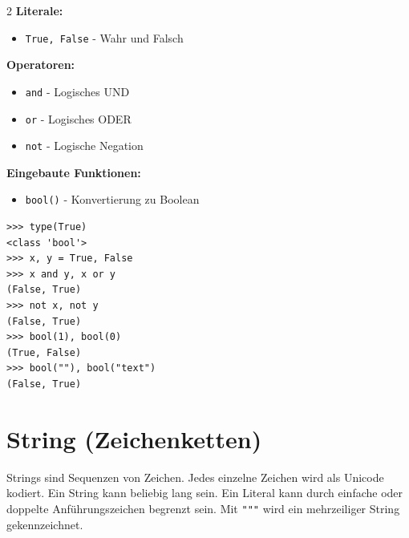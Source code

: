 \documentclass[ngerman,11pt]{article}
\begin{document}
\begin{multicols}{2}\raggedcolumns
\noindent\textbf{Literale:}
\begin{itemize}[leftmargin=*]
    \item \texttt{True, False} - Wahr und Falsch
\end{itemize}
\par\smallskip

\noindent\textbf{Operatoren:}
\begin{itemize}[leftmargin=*]
    \item \texttt{and} - Logisches UND
    \item \texttt{or} - Logisches ODER
    \item \texttt{not} - Logische Negation
\end{itemize}
\par\smallskip

\noindent\textbf{Eingebaute Funktionen:}
\begin{itemize}[leftmargin=*]
    \item \texttt{bool()} - Konvertierung zu Boolean
\end{itemize}
\columnbreak
\begin{lstlisting}
>>> type(True)
<class 'bool'>
>>> x, y = True, False
>>> x and y, x or y
(False, True)
>>> not x, not y
(False, True)
>>> bool(1), bool(0)
(True, False)
>>> bool(""), bool("text")
(False, True)
\end{lstlisting}
\end{multicols}

\section{String (Zeichenketten)}

Strings sind Sequenzen von Zeichen. Jedes einzelne Zeichen wird als Unicode kodiert. Ein String kann beliebig lang sein. Ein Literal kann durch einfache oder doppelte Anführungszeichen begrenzt sein. Mit \texttt{"""} wird ein mehrzeiliger String gekennzeichnet.
\end{document}
